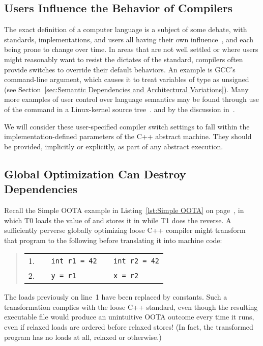 \subsection{Users Influence the Behavior of Compilers}
\label{sec:Users Influence the Behavior of Compilers}

The exact definition of a computer language is a subject of some debate,
with standards, implementations, and users all having their own
influence~\cite{KayvanMemarian2016DepthOfC-1,KayvanMemarian2016DepthOfC-2},
and each being prone to change over time.
In areas that are not well settled or where users might reasonably
want to resist the dictates of the standard,
compilers often provide switches to override their default behaviors.
An example is GCC's  command-line argument,
which causes it to treat variables of type  as unsigned
(see Section~\ref{sec:Semantic Dependencies and Architectural Variations}).
Many more examples of user control over language semantics
may be found through use of the command 
in a Linux-kernel source
tree~\cite[Appendix B]{PaulEMcKenney2023P3046R2/OOTAwithoutTrying}.
and by the discussion
in~\cite{KayvanMemarian2016DepthOfC-1,KayvanMemarian2016DepthOfC-2}.

We will consider these user-specified compiler switch settings to fall
within the implementation-defined parameters of the C++ abstract machine.
They should be provided, implicitly or explicitly, as part of any
abstract execution.

\subsection{Global Optimization Can Destroy Dependencies}
\label{sec:Global Optimization Can Destroy Dependencies}

Recall the Simple OOTA example in Listing~\ref{lst:Simple OOTA} on
page~\pageref{lst:Simple OOTA},
in which T0 loads the value of  and stores it in  while T1
does the reverse.
A sufficiently perverse globally optimizing loose C++ compiler might
transform that program to the following before translating it into
machine code:
\begin{quote}
\small
\begin{tabular}{r|l|l}
1. &
\texttt{~~int r1 = 42} &
	\texttt{~~int r2 = 42} \\
2. &
\texttt{~~y = r1} &
	\texttt{~~x = r2} \\
\end{tabular}
\end{quote}
The loads previously on line~1 have been replaced by constants.
Such a transformation complies with the loose C++ standard,
even though the resulting executable file would produce an unintuitive
OOTA outcome every time it runs, even if relaxed loads are ordered
before relaxed stores!
(In fact, the transformed program has no loads at all, relaxed or otherwise.)

